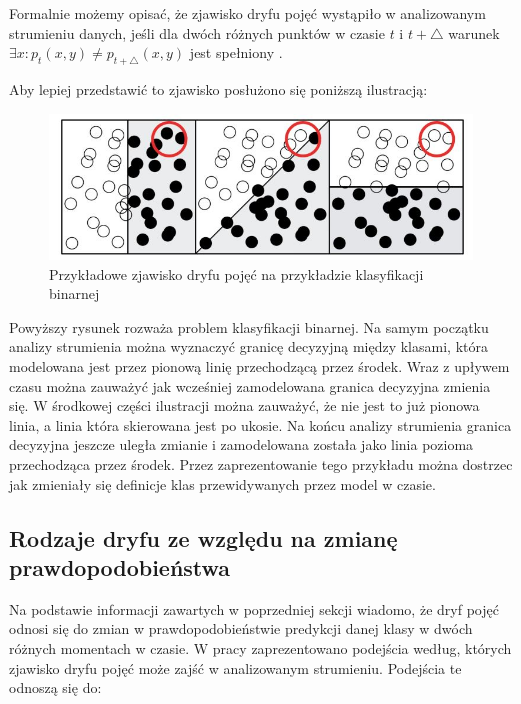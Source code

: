 Formalnie możemy opisać, że zjawisko dryfu pojęć wystąpiło w analizowanym strumieniu danych, jeśli dla dwóch różnych punktów w czasie $t$ i $t + \triangle$ warunek $\exists x : p_t(x, y) \ne p_{t + \triangle}(x, y)$ jest spełniony \cite{Article:DriftGama}\cite{Article:DriftGama2}.

Aby lepiej przedstawić to zjawisko posłużono się poniższą ilustracją:

\begin{figure}[h] 
    \centering\includegraphics[width=14cm]{figures/concept_drift_example.JPG}
    \caption{Przykładowe zjawisko dryfu pojęć na przykładzie klasyfikacji binarnej \cite{DBrzezinski:Prezentacja}}
\end{figure}

\noindent Powyższy rysunek rozważa problem klasyfikacji binarnej. Na samym początku analizy strumienia można wyznaczyć granicę decyzyjną między klasami, która modelowana jest przez pionową linię przechodzącą przez środek. Wraz z upływem czasu można zauważyć jak wcześniej zamodelowana granica decyzyjna zmienia się. W środkowej części ilustracji można zauważyć, że nie jest to już pionowa linia, a linia która skierowana jest po ukosie. Na końcu analizy strumienia granica decyzyjna jeszcze uległa zmianie i zamodelowana została jako linia pozioma przechodząca przez środek. Przez zaprezentowanie tego przykładu można dostrzec jak zmieniały się definicje klas przewidywanych przez model w czasie.

\subsection{Rodzaje dryfu ze względu na zmianę prawdopodobieństwa}

\noindent Na podstawie informacji zawartych w poprzedniej sekcji wiadomo, że dryf pojęć odnosi się do zmian w prawdopodobieństwie predykcji danej klasy w dwóch różnych momentach w czasie. W pracy \cite{Article:Kelly} zaprezentowano podejścia według, których zjawisko dryfu pojęć może zajść w analizowanym strumieniu. Podejścia te odnoszą się do:


